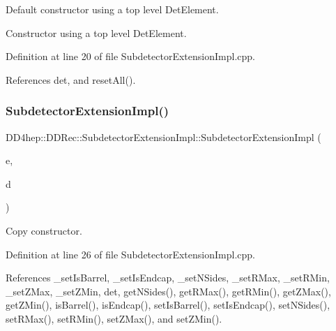 Default constructor using a top level Det\+Element. 

Constructor using a top level Det\+Element. 

Definition at line 20 of file Subdetector\+Extension\+Impl.\+cpp.



References det, and reset\+All().

\hypertarget{class_d_d4hep_1_1_d_d_rec_1_1_subdetector_extension_impl_a9443068ab7f0f9c8da31798bac46fab7}{}\label{class_d_d4hep_1_1_d_d_rec_1_1_subdetector_extension_impl_a9443068ab7f0f9c8da31798bac46fab7} 
\subsubsection{\texorpdfstring{Subdetector\+Extension\+Impl()}{SubdetectorExtensionImpl()}\hspace{0.1cm}{\footnotesize\ttfamily [2/2]}}
{\footnotesize\ttfamily D\+D4hep\+::\+D\+D\+Rec\+::\+Subdetector\+Extension\+Impl\+::\+Subdetector\+Extension\+Impl (\begin{DoxyParamCaption}\item[{const \hyperlink{class_d_d4hep_1_1_d_d_rec_1_1_subdetector_extension_impl}{Subdetector\+Extension\+Impl} \&}]{e,  }\item[{const \hyperlink{class_d_d4hep_1_1_geometry_1_1_det_element}{Geometry\+::\+Det\+Element} \&}]{d }\end{DoxyParamCaption})}



Copy constructor. 



Definition at line 26 of file Subdetector\+Extension\+Impl.\+cpp.



References \+\_\+set\+Is\+Barrel, \+\_\+set\+Is\+Endcap, \+\_\+set\+N\+Sides, \+\_\+set\+R\+Max, \+\_\+set\+R\+Min, \+\_\+set\+Z\+Max, \+\_\+set\+Z\+Min, det, get\+N\+Sides(), get\+R\+Max(), get\+R\+Min(), get\+Z\+Max(), get\+Z\+Min(), is\+Barrel(), is\+Endcap(), set\+Is\+Barrel(), set\+Is\+Endcap(), set\+N\+Sides(), set\+R\+Max(), set\+R\+Min(), set\+Z\+Max(), and set\+Z\+Min().

